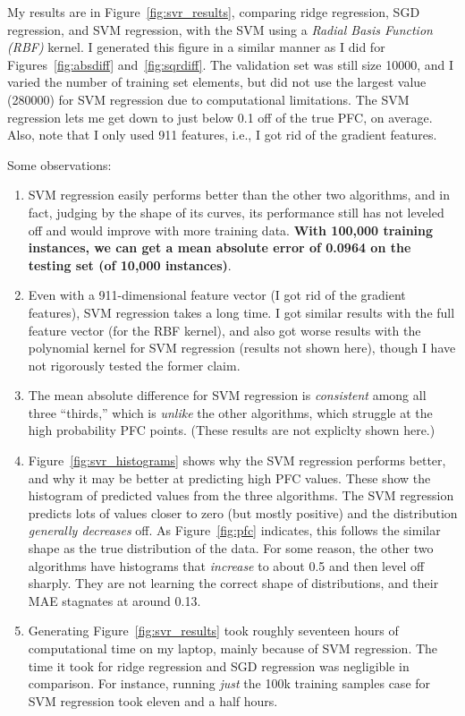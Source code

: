 \documentclass[a4paper, 11pt]{article}
\begin{document}
My results are in Figure~\ref{fig:svr_results}, comparing ridge regression, SGD regression, and SVM
regression, with the SVM using a \emph{Radial Basis Function (RBF)} kernel. I generated this figure
in a similar manner as I did for Figures~\ref{fig:absdiff} and~\ref{fig:sqrdiff}. The validation set
was still size 10000, and I varied the number of training set elements, but did not use the largest
value (280000) for SVM regression due to computational limitations. The SVM regression lets me get
down to just below 0.1 off of the true PFC, on average. Also, note that I only used 911 features,
i.e., I got rid of the gradient features.

Some observations:

\begin{enumerate}
    \item SVM regression easily performs better than the other two algorithms, and in fact, judging
    by the shape of its curves, its performance still has not leveled off and would improve with
    more training data. \textbf{With 100,000 training instances, we can get a mean absolute error of
    0.0964 on the testing set (of 10,000 instances)}.

    \item Even with a 911-dimensional feature vector (I got rid of the gradient features), SVM
    regression takes a long time. I got similar results with the full feature vector (for the RBF
    kernel), and also got worse results with the polynomial kernel for SVM regression (results not
    shown here), though I have not rigorously tested the former claim.

    \item The mean absolute difference for SVM regression is \emph{consistent} among all three
    ``thirds,'' which is \emph{unlike} the other algorithms, which struggle at the high probability
    PFC points. (These results are not expliclty shown here.)

    \item Figure~\ref{fig:svr_histograms} shows why the SVM regression performs better, and why it
    may be better at predicting high PFC values. These show the histogram of predicted values from
    the three algorithms. The SVM regression predicts lots of values closer to zero (but mostly
    positive) and the distribution \emph{generally decreases} off. As Figure~\ref{fig:pfc}
    indicates, this follows the similar shape as the true distribution of the data. For some reason,
    the other two algorithms have histograms that \emph{increase} to about 0.5 and then level off
    sharply. They are not learning the correct shape of distributions, and their MAE stagnates at
    around 0.13.

    \item Generating Figure~\ref{fig:svr_results} took roughly seventeen hours of computational time
    on my laptop, mainly because of SVM regression.  The time it took for ridge regression and SGD
    regression was negligible in comparison. For instance, running \emph{just} the 100k training
    samples case for SVM regression took eleven and a half hours.
\end{enumerate}
\end{document}

